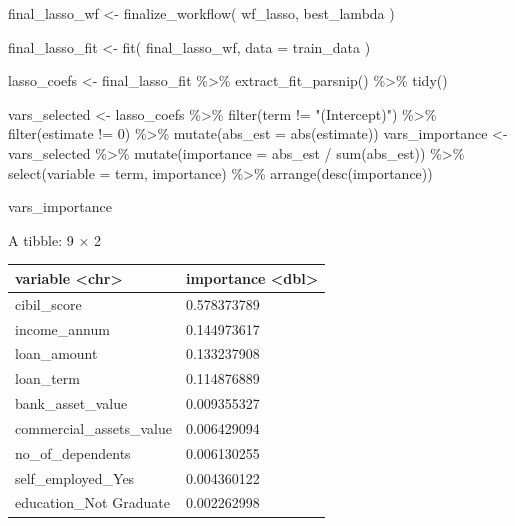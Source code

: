 \documentclass[
  letterpaper,
  DIV=11,
  numbers=noendperiod]{scrartcl}
\newenvironment{Shaded}{\begin{snugshade}}{\end{snugshade}}
\newcommand{\AttributeTok}[1]{\textcolor[rgb]{0.40,0.45,0.13}{#1}}
\newcommand{\DecValTok}[1]{\textcolor[rgb]{0.68,0.00,0.00}{#1}}
\newcommand{\FunctionTok}[1]{\textcolor[rgb]{0.28,0.35,0.67}{#1}}
\newcommand{\NormalTok}[1]{\textcolor[rgb]{0.00,0.23,0.31}{#1}}
\newcommand{\OtherTok}[1]{\textcolor[rgb]{0.00,0.23,0.31}{#1}}
\newcommand{\SpecialCharTok}[1]{\textcolor[rgb]{0.37,0.37,0.37}{#1}}
\newcommand{\StringTok}[1]{\textcolor[rgb]{0.13,0.47,0.30}{#1}}
\newcounter{none} %
\begin{document}
\begin{Shaded}
\begin{Highlighting}[]
\NormalTok{final\_lasso\_wf }\OtherTok{\textless{}{-}} \FunctionTok{finalize\_workflow}\NormalTok{(}
\NormalTok{  wf\_lasso,}
\NormalTok{  best\_lambda}
\NormalTok{)}

\NormalTok{final\_lasso\_fit }\OtherTok{\textless{}{-}} \FunctionTok{fit}\NormalTok{(}
\NormalTok{  final\_lasso\_wf,}
  \AttributeTok{data =}\NormalTok{ train\_data}
\NormalTok{)}

\NormalTok{lasso\_coefs }\OtherTok{\textless{}{-}}\NormalTok{ final\_lasso\_fit }\SpecialCharTok{\%\textgreater{}\%}
  \FunctionTok{extract\_fit\_parsnip}\NormalTok{() }\SpecialCharTok{\%\textgreater{}\%}
  \FunctionTok{tidy}\NormalTok{()}

\NormalTok{vars\_selected }\OtherTok{\textless{}{-}}\NormalTok{ lasso\_coefs }\SpecialCharTok{\%\textgreater{}\%}
  \FunctionTok{filter}\NormalTok{(term }\SpecialCharTok{!=} \StringTok{"(Intercept)"}\NormalTok{) }\SpecialCharTok{\%\textgreater{}\%}
  \FunctionTok{filter}\NormalTok{(estimate }\SpecialCharTok{!=} \DecValTok{0}\NormalTok{) }\SpecialCharTok{\%\textgreater{}\%}
  \FunctionTok{mutate}\NormalTok{(}\AttributeTok{abs\_est =} \FunctionTok{abs}\NormalTok{(estimate))}
\NormalTok{vars\_importance }\OtherTok{\textless{}{-}}\NormalTok{ vars\_selected }\SpecialCharTok{\%\textgreater{}\%}
  \FunctionTok{mutate}\NormalTok{(}\AttributeTok{importance =}\NormalTok{ abs\_est }\SpecialCharTok{/} \FunctionTok{sum}\NormalTok{(abs\_est)) }\SpecialCharTok{\%\textgreater{}\%}
  \FunctionTok{select}\NormalTok{(}\AttributeTok{variable =}\NormalTok{ term, importance) }\SpecialCharTok{\%\textgreater{}\%}
  \FunctionTok{arrange}\NormalTok{(}\FunctionTok{desc}\NormalTok{(importance))}

\NormalTok{vars\_importance}
\end{Highlighting}
\end{Shaded}

A tibble: 9 × 2

{\def\LTcaptype{none} %
\begin{longtable}[]{@{}ll@{}}
\toprule\noalign{}
variable \textless chr\textgreater{} & importance
\textless dbl\textgreater{} \\
\midrule\noalign{}
\endhead
\bottomrule\noalign{}
\endlastfoot
cibil\_score & 0.578373789 \\
income\_annum & 0.144973617 \\
loan\_amount & 0.133237908 \\
loan\_term & 0.114876889 \\
bank\_asset\_value & 0.009355327 \\
commercial\_assets\_value & 0.006429094 \\
no\_of\_dependents & 0.006130255 \\
self\_employed\_Yes & 0.004360122 \\
education\_Not Graduate & 0.002262998 \\
\end{longtable}
}
\end{document}
